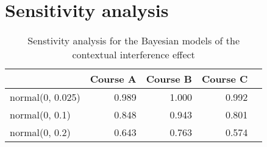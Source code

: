 \section{Sensitivity analysis}

\begin{table}[ht]
\caption{Senstivity analysis for the Bayesian models of the contextual interference effect}\label{paper1: racetimeinteraction}
\centering
\begin{tabular}{lrrrr}
    & Course A & Course B & Course C \\
    \hline
    normal(0, 0.025) & 0.989 & 1.000 & 0.992 \\
    normal(0, 0.1)   & 0.848 & 0.943 & 0.801 \\
    normal(0, 0.2)   & 0.643 & 0.763 & 0.574 \\
\end{tabular}
\end{table}